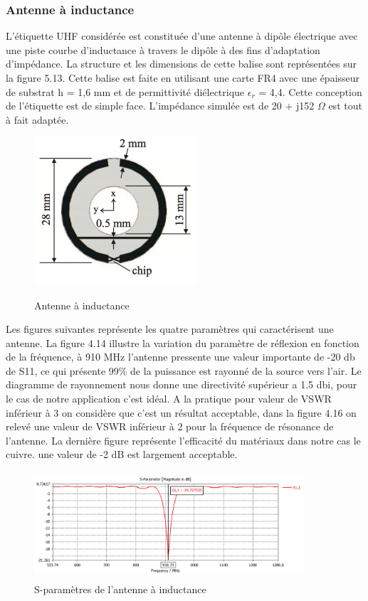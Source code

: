 \documentclass[11pt, a4paper, twoside]{book}
\begin{document}
\subsubsection{Antenne à inductance}


L'étiquette UHF considérée est constituée d’une antenne à dipôle électrique avec une piste courbe d’inductance à travers le dipôle à des fins d'adaptation d'impédance. La structure et les dimensions de cette balise sont représentées sur la figure 5.13. Cette balise est faite en utilisant une carte FR4 avec une épaisseur de substrat h = 1,6 mm et de permittivité diélectrique \(\epsilon_{r}\) = 4,4. Cette conception de l’étiquette est de simple face. L'impédance simulée est de 20 + j152 \(\Omega\) est tout à fait adaptée.\\
 
 \begin{figure}[H]
\centering
\includegraphics[width=6cm]{dofi}\\
\caption{Antenne à inductance}
\end{figure} 

Les figures suivantes représente les quatre paramètres qui caractérisent une antenne. La figure 4.14 illustre
la variation du paramètre de réflexion en fonction de la fréquence, à 910 MHz l'antenne pressente une valeur importante de -20 db de S11, ce qui présente 99\% de la puissance est rayonné de la source vers l'air. Le diagramme de rayonnement  nous donne une directivité supérieur a 1.5 dbi, pour le cas de notre application c'est idéal. A la pratique pour valeur de VSWR inférieur à 3 on considère que c'est un résultat acceptable, dans la figure 4.16  on relevé une valeur de VSWR inférieur à 2 pour la fréquence de résonance de l'antenne. La dernière figure représente l'efficacité du matériaux dans notre cas le cuivre. une valeur de -2 dB est largement acceptable.
\begin{figure}[H]
\centering
\includegraphics[width=10cm,height=4cm]{clas11}
\caption{S-paramètres de l'antenne à inductance}
\end{figure} 
\end{document}
